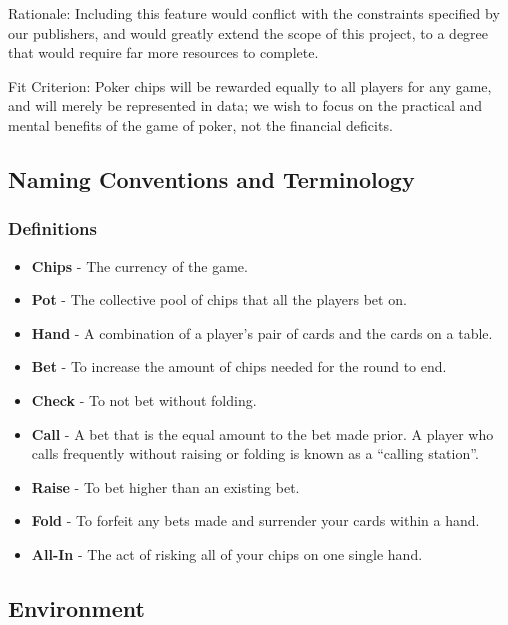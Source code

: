 \documentclass[12pt, titlepage]{article}
\begin{document}
Rationale: Including this feature would conflict with the constraints specified by our publishers, and would greatly extend the scope of this project, to a degree that would require far more resources to complete.

Fit Criterion: Poker chips will be rewarded equally to all players for any game, and will merely be represented in data; we wish to focus on the practical and mental benefits of the game of poker, not the financial deficits.  

\subsection{Naming Conventions and Terminology}
\subsubsection{Definitions}
\begin{itemize}
    \item \textbf{Chips} - The currency of the game.
    \item \textbf{Pot} - The collective pool of chips that all the players bet on.
    \item \textbf{Hand} - A combination of a player's pair of cards and the cards on a table.
    \item \textbf{Bet} - To increase the amount of chips needed for the round to end.
    \item \textbf{Check} - To not bet without folding.
    \item \textbf{Call} - A bet that is the equal amount to the bet made prior. A player who calls frequently without raising or folding is known as a “calling station”.
    \item \textbf{Raise} - To bet higher than an existing bet.
    \item \textbf{Fold} - To forfeit any bets made and surrender your cards within a hand.
    \item \textbf{All-In} - The act of risking all of your chips on one single hand.
\end{itemize}

\subsection{Environment}
\end{document}

